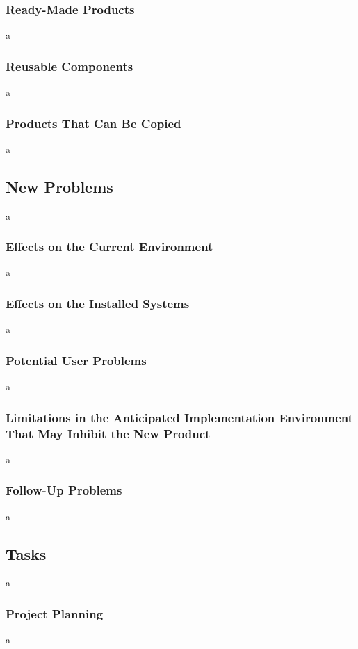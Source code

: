 \documentclass[12pt]{article}
\begin{document}
\subsubsection{Ready-Made Products}
a

\subsubsection{Reusable Components}
a

\subsubsection{Products That Can Be Copied}
a

\subsection{New Problems}
a

\subsubsection{Effects on the Current Environment}
a

\subsubsection{Effects on the Installed Systems }
a

\subsubsection{Potential User Problems}
a

\subsubsection{Limitations in the Anticipated Implementation Environment That May Inhibit the New Product}
a

\subsubsection{Follow-Up Problems}
a

\subsection{Tasks}
a

\subsubsection{Project Planning}
a
\end{document}

